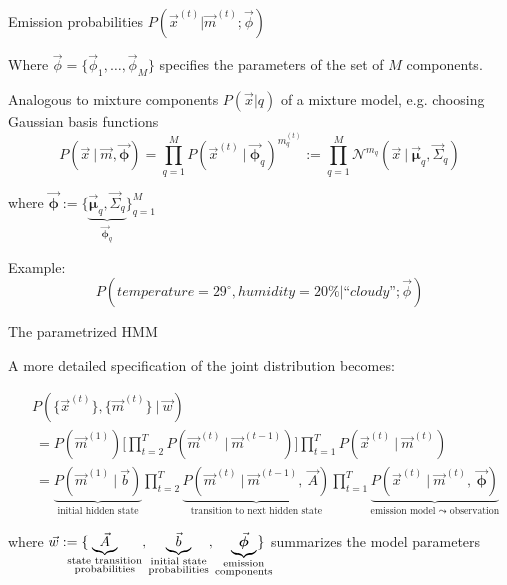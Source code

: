 \begin{frame}{\subsubsecname}

Emission probabilities $P(\vec x^{(t)} | \vec m^{(t)} ; \vec \phi)$

Where $\vec \phi = \{\vec \phi_1, \ldots, \vec \phi_M\}$ specifies the parameters of the set of $M$ components.

Analogous to mixture components $P(\vec x| q)$ of a mixture model, e.g. choosing Gaussian basis functions
\begin{equation}
P(\vec{x} ~|~ \vec{m}, \vec{\boldsymbol{\phi}}) = \prod_{q=1}^M
	P(\vec{x}^{(t)} ~|~ \vec{\boldsymbol{\phi}}_q)^{m_q^{(t)}} := \prod_{q=1}^M \mathcal{N}^{m_q} (\vec{x} ~|~ \vec{\boldsymbol{\mu}}_q, \vec{\Sigma}_q)
\end{equation}
				
where $\vec{\boldsymbol{\phi}} := \big\{\underbrace{\vec{\boldsymbol{\mu}}_q, \vec{\Sigma}_q}_{\vec{\boldsymbol{\phi}}_q} \big\}_{q=1}^M$

Example:\\
\begin{equation}
P(\mathit{temperature}=29^{\circ}, \mathit{humidity}=20\% | \text{``}\mathit{cloudy}\text{''}; \vec \phi)
\end{equation}

\end{frame}

\begin{frame}{The parametrized HMM}
	
A more detailed specification of the joint distribution becomes:
	
	\begin{align}
	&P(\{\vec{x}^{(t)}\}  , \{\vec{m}^{(t)}\} ~|~ \vec{w})
	 \\&
	~=P(\vec{m}^{(1)})
	\Bigg\lbrack
	\prod_{t=2}^T
	P(\vec{m}^{(t)} ~|~ \vec{m}^{(t-1)})
	\Bigg\rbrack
	\prod_{t=1}^T P(\vec{x}^{(t)} ~|~ \vec{m}^{(t)})
	\\&~=
	\underbrace{P(\vec{m}^{(1)}~|~ \vec{b})}_{\text{initial hidden state}}
	\prod_{t=2}^{T} 
		\underbrace{P(\vec{m}^{(t)}~|~  \vec{m}^{(t - 1)},~ \vec{A})
		}_{\text{transition to next hidden state}}
	\prod_{t=1}^{T} 
	\underbrace{P(\vec{x}^{(t)}~|~  \vec{m}^{(t)},~ \vec{\boldsymbol{\phi}})
	}_{\text{emission model $\leadsto$ observation}}
	\end{align}
	
	where $\vec{w} := \{ 
	\kern-3.5ex
		\underbrace{\vec{A}}_{\substack{\text{state transition} \\ \text{probabilities}}}, \underbrace{\vec{b}}_{\substack{\text{initial state} \\ \text{probabilities}}}, \underbrace{\vec{\boldsymbol{\phi}}}_{\substack{\text{emission} \\ \text{components}}} 
	\kern-2.5ex
		\}$ summarizes the model parameters
	
\end{frame}
